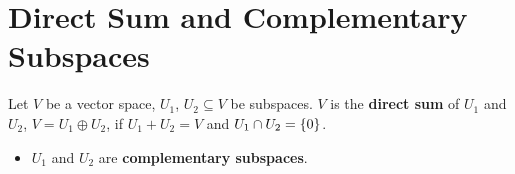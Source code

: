 \documentclass[letterpaper,12pt]{article}
\begin{document}
\section*{Direct Sum and Complementary Subspaces}
\begin{definition}
Let $V$ be a vector space, $U_1$, $U_2 \subseteq V$ be subspaces. $V$ is the \textbf{direct sum} of $U_1$ and $U_2$, $V = U_1 \oplus U_2$, if $U_1 + U_2 = V$ and $U_1 \cap U_2 = \left\{ 0 \right\}$.
\begin{itemize}
    \item $U_1$ and $U_2$ are \textbf{complementary subspaces}.
\end{itemize}
\end{definition}
\end{document}
